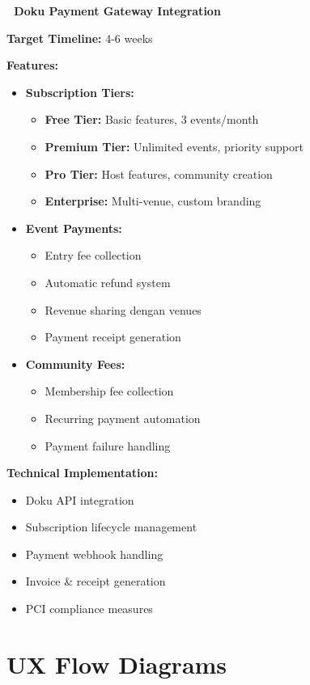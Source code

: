 \documentclass[12pt,a4paper]{article}
\begin{document}
\begin{planned}
\textbf{🔄 Doku Payment Gateway Integration}

\textbf{Target Timeline:} 4-6 weeks

\textbf{Features:}
\begin{itemize}
    \item \textbf{Subscription Tiers:}
    \begin{itemize}
        \item \textbf{Free Tier:} Basic features, 3 events/month
        \item \textbf{Premium Tier:} Unlimited events, priority support
        \item \textbf{Pro Tier:} Host features, community creation
        \item \textbf{Enterprise:} Multi-venue, custom branding
    \end{itemize}
    \item \textbf{Event Payments:}
    \begin{itemize}
        \item Entry fee collection
        \item Automatic refund system
        \item Revenue sharing dengan venues
        \item Payment receipt generation
    \end{itemize}
    \item \textbf{Community Fees:}
    \begin{itemize}
        \item Membership fee collection
        \item Recurring payment automation
        \item Payment failure handling
    \end{itemize}
\end{itemize}

\textbf{Technical Implementation:}
\begin{itemize}
    \item Doku API integration
    \item Subscription lifecycle management
    \item Payment webhook handling
    \item Invoice \& receipt generation
    \item PCI compliance measures
\end{itemize}
\end{planned}

\section{UX Flow Diagrams}
\end{document}
